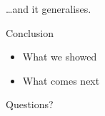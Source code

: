 \documentclass[landscape]{slides}
\begin{document}
\begin{overlay}
\begin{center}\Large \ldots and it generalises.\end{center}
\end{overlay}

\begin{slide}
\begin{center}\Large Conclusion\end{center}

\begin{itemize}
\item What we showed
\item What comes next
\end{itemize}

\vspace{2em}
\begin{center}Questions?\end{center}
\end{slide}
\end{document}
